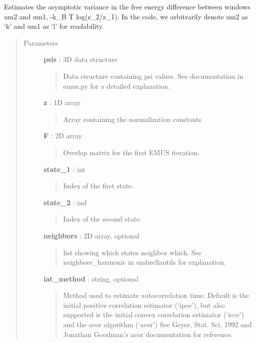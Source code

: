 \documentclass[letterpaper,10pt,english]{sphinxmanual}
\begin{document}
\begin{fulllineitems}
\label{modules/avar:avar.avar_zfe}
Estimates the asymptotic variance in the free energy difference 
between windows um2 and um1, -k\_B T log(z\_2/z\_1). In the code, we
arbitrarily denote um2 as `k' and um1 as `l' for readability.
\begin{quote}\begin{description}
\item[{Parameters}] \leavevmode
\textbf{psis} : 3D data structure
\begin{quote}

Data structure containing psi values.  See documentation in emus.py for a detailed explanation.
\end{quote}

\textbf{z} : 1D array
\begin{quote}

Array containing the normalization constants
\end{quote}

\textbf{F} : 2D array
\begin{quote}

Overlap matrix for the first EMUS iteration.
\end{quote}

\textbf{state\_1} : int
\begin{quote}

Index of the first state.
\end{quote}

\textbf{state\_2} : ind
\begin{quote}

Index of the second state.
\end{quote}

\textbf{neighbors} : 2D array, optional
\begin{quote}

list showing which states neighbor which.  See neighbors\_harmonic in umbrellautils for explanation.
\end{quote}

\textbf{iat\_method} : string, optional
\begin{quote}

Method used to estimate autocorrelation time.  Default is the initial positive correlation estimator (`ipce'), but also supported is the initial convex correlation estimator (`icce') and the acor algorithm (`acor')  See Geyer, Stat. Sci. 1992 and Jonathan Goodman's acor documentation for reference.
\end{quote}


\end{description}
\end{quote}
\end{fulllineitems}
\end{document}
